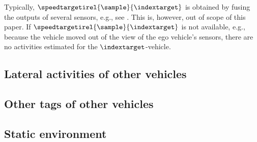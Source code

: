 \cstarta
\begin{remark}
	Typically, $\speedtargetirel{\sample}{\indextarget}$ is obtained by fusing the outputs of several sensors, e.g., see \autocite{elfring2016effective}. This is, however, out of scope of this paper. If $\speedtargetirel{\sample}{\indextarget}$ is not available, e.g., because the vehicle moved out of the view of the ego vehicle's sensors, there are no activities estimated for the $\indextarget$-vehicle.
\end{remark}
\cenda




\subsection{Lateral activities of other vehicles}
\label{sec:lateral other vehicles}




\subsection{Other tags of other vehicles}
\label{sec:other tags other vehicles}




\subsection{Static environment}
\label{sec:static environment}

